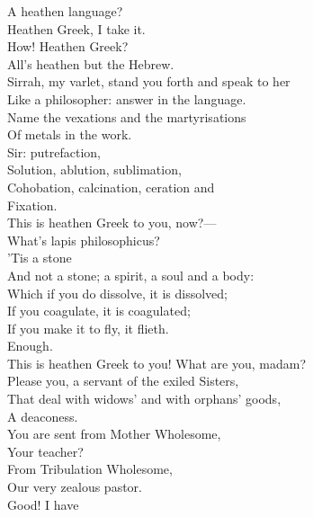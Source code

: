 \documentclass[a4paper,oneside,12pt]{memoir}
\begin{document}
\begin{drama*}
\subtlespeaks A heathen language?\\
\persecutionspeaks {} Heathen Greek, I take it.\\
\subtlespeaks How! Heathen Greek?\\
\persecutionspeaks {} All's heathen but the Hebrew.\\
\subtlespeaks Sirrah, my varlet, stand you forth and speak to her\\
Like a philosopher: answer in the language.\\
Name the vexations and the martyrisations\\
Of metals in the work.\\
\facespeaks {} Sir: putrefaction,\\
Solution, ablution, sublimation,\\
Cohobation, calcination, ceration and\\
Fixation.\\
\subtlespeaks {} This is heathen Greek to you, now?---\\
What's lapis philosophicus?\\
\facespeaks {} 'Tis a stone\\
And not a stone; a spirit, a soul and a body:\\
Which if you do dissolve, it is dissolved;\\
If you coagulate, it is coagulated;\\
If you make it to fly, it flieth.\\
\subtlespeaks {} Enough.\\
This is heathen Greek to you! What are you, madam?\\
\persecutionspeaks Please you, a servant of the exiled Sisters,\\
That deal with widows' and with orphans' goods,\\
A deaconess.\\
\subtlespeaks {} You are sent from Mother Wholesome,\\
Your teacher?\\
\persecutionspeaks {} From Tribulation Wholesome,\\
Our very zealous pastor.\\
\subtlespeaks {} Good! I have\\

\end{drama*}
\end{document}
